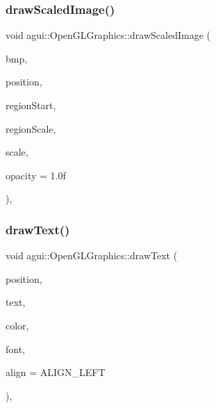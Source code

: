 \mbox{\label{classagui_1_1_open_g_l_graphics_a0b7bde4bebc7566ff78f04b5656c38b9}} 
\subsubsection{\texorpdfstring{draw\+Scaled\+Image()}{drawScaledImage()}}
{\footnotesize\ttfamily void agui\+::\+Open\+G\+L\+Graphics\+::draw\+Scaled\+Image (\begin{DoxyParamCaption}\item[{const \mbox{\hyperlink{class_image}{Image}} $\ast$}]{bmp,  }\item[{const Point \&}]{position,  }\item[{const Point \&}]{region\+Start,  }\item[{const Dimension \&}]{region\+Scale,  }\item[{const Dimension \&}]{scale,  }\item[{const float \&}]{opacity = {\ttfamily 1.0f} }\end{DoxyParamCaption})\hspace{0.3cm}{\ttfamily [override]}, {\ttfamily [virtual]}}

\mbox{\label{classagui_1_1_open_g_l_graphics_a454da19b9133ed6ca6defea2abc832c4}} 
\subsubsection{\texorpdfstring{draw\+Text()}{drawText()}}
{\footnotesize\ttfamily void agui\+::\+Open\+G\+L\+Graphics\+::draw\+Text (\begin{DoxyParamCaption}\item[{const Point \&}]{position,  }\item[{const char $\ast$}]{text,  }\item[{const Color \&}]{color,  }\item[{const \mbox{\hyperlink{class_font}{Font}} $\ast$}]{font,  }\item[{Alignment\+Enum}]{align = {\ttfamily ALIGN\+\_\+LEFT} }\end{DoxyParamCaption})\hspace{0.3cm}{\ttfamily [override]}, {\ttfamily [virtual]}}

